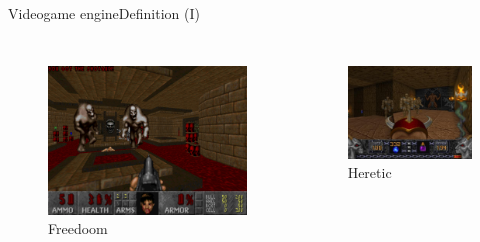 \documentclass[10pt,compress]{beamer} %
\begin{document}
\begin{frame}{Videogame engine}{Definition (I)}
	\vspace{-0.2cm}
    \begin{columns}
   	 	\begin{figure}[t]
		\begin{center}
		    \includegraphics[width=0.8\linewidth]{figs/freedoom}\\
			Freedoom
			\bigskip
		\end{center}
   	 	\end{figure}
   	 	\begin{figure}[t]
		\begin{center}
		    \includegraphics[width=0.8\linewidth]{figs/heretic}\\
			Heretic
			\bigskip
		\end{center}
   	 	\end{figure}
	\end{columns}
\end{frame}
\end{document}
